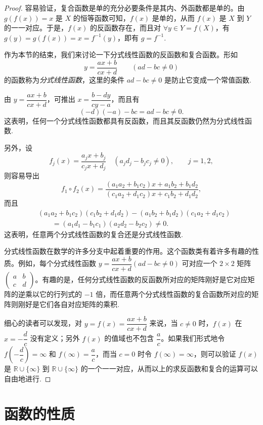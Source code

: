 \begin{proof}
容易验证，复合函数是单的充分必要条件是其内、外函数都是单的。由 $g(f(x))=x$ 是 $X$ 的恒等函数可知，$f(x)$ 是单的，从而 $f(x)$ 是 $X$ 到 $Y$ 的一一对应。于是，$f(x)$ 的反函数存在，而且对 $\forall y\in Y=f(X)$，有 $g(y)=g(f(x))=x=f^{-1}(y)$，即有 $g=f^{-1}$.

作为本节的结束，我们来讨论一下分式线性函数的反函数和复合函数。形如
\[
  y=\frac{ax+b}{cx+d}\qquad (ad-bc\ne0)
\]
的函数称为\emph{分式线性函数}，这里的条件 $ad-bc\ne0$ 是防止它变成一个常值函数.

由 $y=\dfrac{ax+b}{cx+d}$，可推出 $x=\dfrac{b-dy}{cy-a}$，而且有
\[
  (-d)(-a)-bc=ad-bc\ne0.
\]
这表明，任何一个分式线性函数都具有反函数，而且其反函数仍然为分式线性函数.

另外，设
\[
  f_j(x)=\frac{a_jx+b_j}{c_jx+d_j}\quad (a_jd_j-b_jc_j\ne0),\qquad j=1,2,
\]
则容易导出
\[
  f_1\circ f_2(x)=
  \frac{(a_1a_2+b_1c_2)x+a_1b_2+b_1d_2}
  {(c_1a_2+d_1c_2)x+c_1b_2+d_1d_2},
\]
而且
\[
\begin{aligned}
 &(a_1a_2+b_1c_2)(c_1b_2+d_1d_2)
 -(a_1b_2+b_1d_2)(c_1a_2+d_1c_2)\\
 &\qquad=(a_1d_1-b_1c_1)(a_2d_2-b_2c_2)\ne0.
\end{aligned}
\]
这表明，任意两个分式线性函数的复合还是分式线性函数.

分式线性函数在数学的许多分支中起着重要的作用。这个函数类有着许多有趣的性质。例如，每个分式线性函数 $y=\dfrac{ax+b}{cx+d}(ad-bc\ne0)$ 可对应一个 $2\times2$ 矩阵 $\begin{pmatrix}a&b\\ c&d\end{pmatrix}$。有趣的是，任何分式线性函数的反函数所对应的矩阵刚好是它对应矩阵的逆乘以它的行列式的 $-1$ 倍，而任意两个分式线性函数的复合函数所对应的矩阵则刚好是它们各自对应矩阵的乘积.

细心的读者可以发现，对 $y=f(x)=\dfrac{ax+b}{cx+d}$ 来说，当 $c\ne0$ 时，$f(x)$ 在 $x=-\dfrac dc$ 没有定义；另外 $f(x)$ 的值域也不包含 $\dfrac ac$。如果我们形式地令 $f(-\dfrac dc)=\infty$ 和 $f(\infty)=\dfrac ac$，而当 $c=0$ 时令 $f(\infty)=\infty$，则可以验证 $f(x)$ 是 $\mathbb{R}\cup\{\infty\}$ 到 $\mathbb{R}\cup\{\infty\}$ 的一个一一对应，从而以上的求反函数和复合的运算可以自由地进行.
\end{proof}


\section{函数的性质}
\label{sec:ma-1-3}

